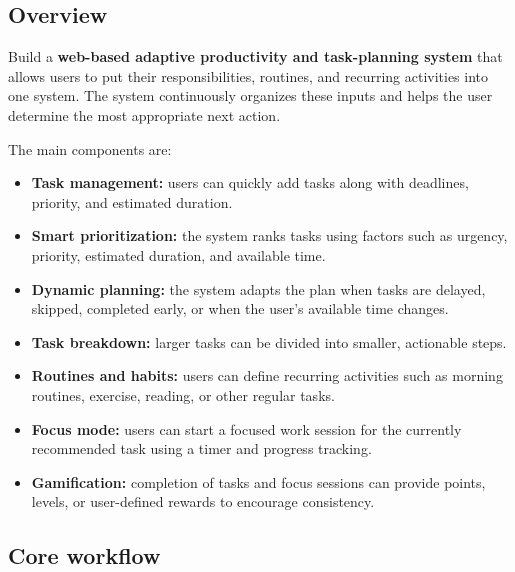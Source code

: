 \documentclass[11pt,a4paper]{article}
\begin{document}
\subsection{Overview}

Build a \textbf{web-based adaptive productivity and task-planning system}
that allows users to put their responsibilities, routines, and recurring
activities into one system. The system continuously organizes these inputs
and helps the user determine the most appropriate next action.

The main components are:

\begin{itemize}[leftmargin=0.7cm]
    \item \textbf{Task management:} users can quickly add tasks along with
    deadlines, priority, and estimated duration.
    
    \item \textbf{Smart prioritization:} the system ranks tasks using factors
    such as urgency, priority, estimated duration, and available time.
    
    \item \textbf{Dynamic planning:} the system adapts the plan when tasks are
    delayed, skipped, completed early, or when the user's available time
    changes.
    
    \item \textbf{Task breakdown:} larger tasks can be divided into smaller,
    actionable steps.
    
    \item \textbf{Routines and habits:} users can define recurring activities
    such as morning routines, exercise, reading, or other regular tasks.
    
    \item \textbf{Focus mode:} users can start a focused work session for the
    currently recommended task using a timer and progress tracking.
    
    \item \textbf{Gamification:} completion of tasks and focus sessions can
    provide points, levels, or user-defined rewards to encourage consistency.
\end{itemize}

\subsection{Core workflow}
\end{document}
